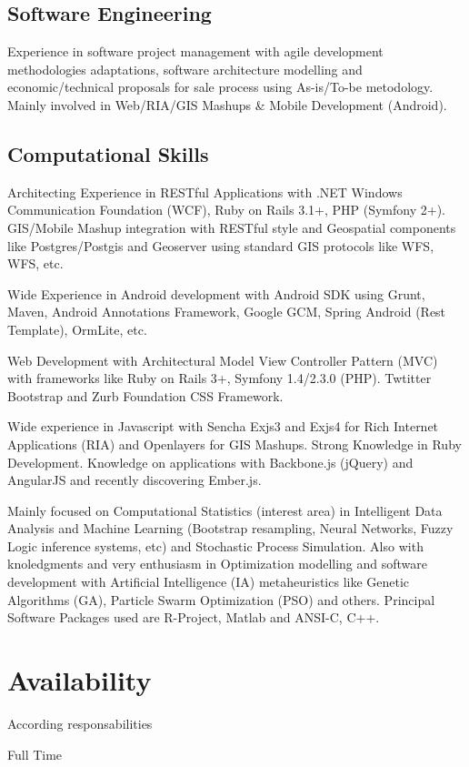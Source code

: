 \documentclass[11pt,letterpaper,roman]{moderncv}
\begin{document}
	\subsection{Software Engineering}
		{Experience in software project management with agile development
		methodologies adaptations, software architecture modelling and economic/technical proposals for sale process
		using As-is/To-be metodology. Mainly involved in Web/RIA/GIS Mashups \& Mobile Development (Android).}
		
	\subsection{Computational Skills}

		{Architecting Experience in RESTful Applications with .NET Windows
		Communication Foundation (WCF), Ruby on Rails 3.1+, PHP (Symfony 2+). GIS/Mobile Mashup
		integration with RESTful style and Geospatial components like Postgres/Postgis
		and Geoserver using standard GIS protocols like WFS, WFS, etc.}

		{Wide Experience in Android development with Android
		SDK using Grunt, Maven, Android Annotations Framework, Google GCM, Spring Android (Rest Template), OrmLite, etc.}

		{Web Development with Architectural Model View
		Controller Pattern (MVC) with frameworks like Ruby on Rails 3+, Symfony 1.4/2.3.0 (PHP). Twtitter Bootstrap and Zurb Foundation CSS Framework.}

		{Wide experience in Javascript with Sencha
		Exjs3 and Exjs4 for Rich Internet Applications (RIA) and Openlayers for GIS
		Mashups. Strong Knowledge in Ruby Development. Knowledge on applications with Backbone.js (jQuery) and AngularJS and recently discovering Ember.js.}

		{Mainly focused on Computational Statistics (interest area) in
		Intelligent Data Analysis and Machine Learning (Bootstrap resampling, Neural
		Networks, Fuzzy Logic inference systems, etc)  and Stochastic Process
		Simulation. Also with knoledgments and very enthusiasm in Optimization modelling
		and software development with Artificial Intelligence (IA) metaheuristics like
		Genetic Algorithms (GA), Particle Swarm Optimization (PSO) and others. Principal
		Software Packages used are R-Project, Matlab and ANSI-C, C++.}

\section{Availability}
	{According responsabilities}

	{Full Time}
\end{document}
